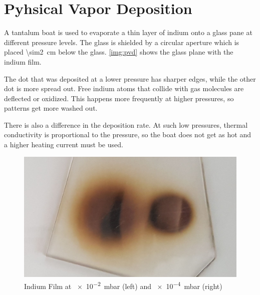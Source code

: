 \chapter{Pyhsical Vapor Deposition}

A tantalum boat is used to evaporate a thin layer of indium onto a glass pane at different pressure levels.
The glass is shielded by a circular aperture which is placed \SI{\sim2}{\cm} below the glass.
\autoref{img:pvd} shows the glass plane with the indium film.

The dot that was deposited at a lower pressure has sharper edges, while the other dot is more spread out.
Free indium atoms that collide with gas molecules are deflected or oxidized.
This happens more frequently at higher pressures, so patterns get more washed out.

There is also a difference in the deposition rate.
At such low pressures, thermal conductivity is proportional to the pressure, so the boat does not get as hot and a higher heating current must be used.

\begin{figure}[b!]
	\centering
	\includegraphics[width=.6\textwidth]{img/pvd.jpg}
	\caption[Indium Film]{Indium Film at \SI{e-2}{\milli\bar} (left) and \SI{e-4}{\milli\bar} (right)}
	\label{img:pvd}
\end{figure}
